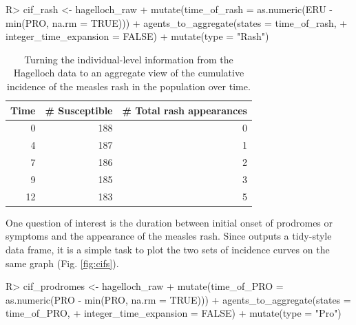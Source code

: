 \documentclass[
  shortnames]{jss}
\begin{document}
\begin{CodeChunk}
\begin{CodeInput}
R> cif_rash  <- hagelloch_raw %
+   mutate(time_of_rash = as.numeric(ERU - min(PRO, na.rm = TRUE))) %
+   agents_to_aggregate(states = time_of_rash,
+                       integer_time_expansion = FALSE) %
+   mutate(type = "Rash")
\end{CodeInput}
\end{CodeChunk}

\begin{CodeChunk}
\begin{table}[!h]

\caption{\label{tab:cif-rash}Turning the individual-level information from the Hagelloch data to an aggregate view of the cumulative incidence of the measles rash in the population over time.}
\centering
\begin{tabular}[t]{rrr}
\toprule
Time & \# Susceptible & \# Total rash appearances\\
\midrule
0 & 188 & 0\\
4 & 187 & 1\\
7 & 186 & 2\\
9 & 185 & 3\\
12 & 183 & 5\\
\bottomrule
\end{tabular}
\end{table}

\end{CodeChunk}

One question of interest is the duration between initial onset of
prodromes or symptoms and the appearance of the measles rash. Since
 outputs a tidy-style data frame, it is a
simple task to plot the two sets of incidence curves on the same graph
(Fig. \ref{fig:cifs}).

\begin{CodeChunk}
\begin{CodeInput}
R> cif_prodromes <- hagelloch_raw %
+   mutate(time_of_PRO = as.numeric(PRO - min(PRO, na.rm = TRUE))) %
+   agents_to_aggregate(states = time_of_PRO,
+                       integer_time_expansion = FALSE) %
+   mutate(type = "Pro")
\end{CodeInput}
\end{CodeChunk}
\end{document}
